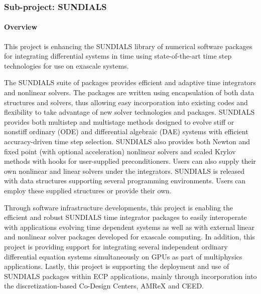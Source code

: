 \subsubsection{ Sub-project: SUNDIALS}
\label{subsubsect:SUNDIALS-hypre}

\paragraph{Overview}

This project is enhancing the SUNDIALS library of numerical software packages for integrating differential systems in time using state-of-the-art time step technologies for use on exascale systems.

The SUNDIALS suite of packages \cite{SUNDIALSweb} provides efficient and adaptive time integrators and nonlinear solvers.  The packages are written using encapsulation of both data structures and solvers, thus allowing easy incorporation into existing codes and flexibility to take advantage of new solver technologies and packages.  SUNDIALS provides both multistep and multistage methods designed to evolve stiff or nonstiff ordinary (ODE) and differential algebraic (DAE) systems
with efficient accuracy-driven time step selection.
SUNDIALS also provides both Newton and fixed point (with optional acceleration) nonlinear solvers and scaled Krylov methods with hooks for user-supplied preconditioners.  Users can also supply their own nonlinear and linear solvers under the integrators.  SUNDIALS is released with data structures supporting several programming environments.  Users can employ these supplied structures or provide their own.

Through software infrastructure developments, this project is enabling the efficient and robust SUNDIALS time integrator packages to easily interoperate with applications evolving time dependent systems as well as with external linear and nonlinear solver packages developed for exascale computing.  In addition, this project is providing support for integrating several independent ordinary differential equation systems simultaneously on GPUs as part of multiphysics applications.  Lastly, this project is supporting the deployment and use of SUNDIALS packages within ECP applications, mainly through incorporation into the discretization-based Co-Design Centers, AMReX and CEED.




